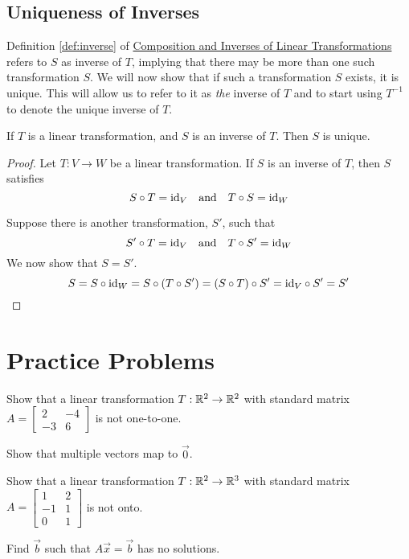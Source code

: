 \documentclass{ximera}
\begin{document}
\subsection*{Uniqueness of Inverses}

Definition \ref{def:inverse} of \href{\xmbaseurl/LTR-0030/main}{Composition and Inverses of Linear Transformations} refers to $S$ as  inverse of $T$, implying that there may be more than one such transformation $S$.  We will now show that if such a transformation $S$ exists, it is unique.  This will allow us to refer to it as {\it the} inverse of $T$ and to start using $T^{-1}$ to denote the unique inverse of $T$.

\begin{theorem}\label{th:inverseisunique}
If $T$ is a linear transformation, and $S$ is an inverse of $T$.  Then $S$ is unique.
\end{theorem}
\begin{proof}
Let $T:V\rightarrow W$ be a linear transformation.  If $S$ is an inverse of $T$, then $S$ satisfies
$$S\circ T=\text{id}_V\quad \text{and}\quad T\circ S=\text{id}_W$$

Suppose there is another transformation, $S'$, such that 
$$S'\circ T=\text{id}_V\quad \text{and}\quad T\circ S'=\text{id}_W$$
We now show that $S=S'$.
$$S=S\circ \text{id}_W=S\circ(T\circ S')=(S\circ T)\circ S'=\text{id}_V\circ S'=S'$$
\end{proof}

\section*{Practice Problems}
\begin{problem}\label{prob:inverses1}
Show that a linear transformation $T:\mathbb{R}^2\rightarrow \mathbb{R}^2$ with standard matrix $A=\begin{bmatrix}2&-4\\-3&6\end{bmatrix}$ is not one-to-one.
\begin{hint}
        Show that multiple vectors map to $\vec{0}$.
      \end{hint}
\end{problem}
 
 \begin{problem}\label{prob:inverses2}
 Show that a linear transformation $T:\mathbb{R}^2\rightarrow \mathbb{R}^3$ with standard matrix $A=\begin{bmatrix}1&2\\-1&1\\0&1\end{bmatrix}$ is not onto.
 \begin{hint}
 Find $\vec{b}$ such that $A\vec{x}=\vec{b}$ has no solutions.
 \end{hint}
 \end{problem}
 
\end{document}
